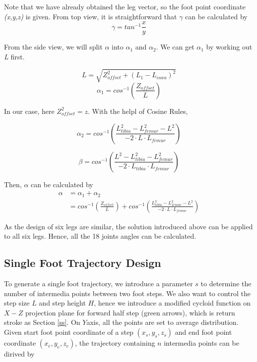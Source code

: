 \documentclass[conference]{IEEEtran}
\begin{document}
Note that we have already obtained the leg vector, so the foot point coordinate \textit{(x,y,z)} is given. From top view, it is straightforward that \(\gamma\) can be calculated by 
\begin{equation}
    \gamma = tan^{-1} \frac{x}{y}
\end{equation}

From the side view, we will split \(\alpha\) into \(\alpha_1\) and \(\alpha_2\). We can get \(\alpha_1\) by working out \textit{L} first.

\begin{equation}
    L=\sqrt{Z^{2}_{offset} + (L_1 - L_{coxa})^2}
\end{equation}
\begin{equation}
    \alpha_1 = cos^{-1}(\frac{Z_{offset}}{L})
\end{equation}

In our case, here \(Z^{2}_{offset}=z\). With the helpl of Cosine Rules,

\begin{equation}
    \alpha_2 = cos^{-1}(\frac{L_{tibia}^2-L_{femur}^2 - L^2}{-2\cdot L \cdot L_{femur}})
\end{equation}

\begin{equation}
    \beta = cos^{-1}(\frac{ L^2-L_{tibia}^2-L_{femur}^2}{-2\cdot L_{tibia} \cdot L_{femur}})
\end{equation}

Then, \(\alpha\) can be calculated by 
\begin{equation}
    \begin{aligned}
        \alpha &= \alpha_1 + \alpha_2\\
        &= cos^{-1}(\frac{Z_{offset}}{L})+cos^{-1}(\frac{L_{tibia}^2-L_{femur}^2 - L^2}{-2\cdot L \cdot L_{femur}})
    \end{aligned}
\end{equation}

As the design of six legs are similar, the solution introduced above can be applied to all six legs. Hence, all the 18 joints angles can be calculated.

\subsection{Single Foot Trajectory Design}

To generate a single foot trajectory, we introduce a parameter \(s\) to determine the number of intermedia points between two foot steps. We also want to control the step size \(L\) and step height \(H\), hence we introduce a modified cycloid function on \(X-Z\) projection plane for forward half step (green arrows), which is return stroke as Section \ref{ss}. On \(Y\)axis, all the points are set to average distribution. Given start foot point coordinate of a step \((x_s, y_s, z_s)\) and end foot point coordinate \((x_e, y_e, z_e)\), the trajectory containing \(n\) intermedia points can be dirived by 
\end{document}
